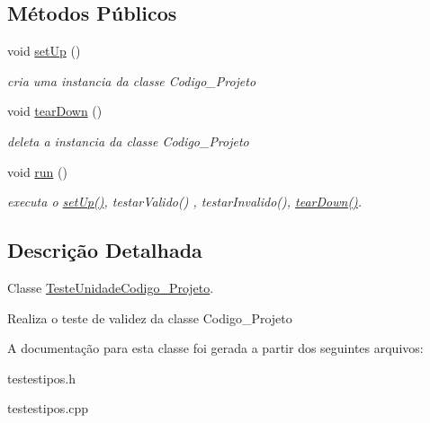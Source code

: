 \subsection*{\-Métodos \-Públicos}
\begin{DoxyCompactItemize}
\item 
\hypertarget{class_teste_unidade_codigo___projeto_a08873edf78ee0550b0377da24fc574fb}{
void \hyperlink{class_teste_unidade_codigo___projeto_a08873edf78ee0550b0377da24fc574fb}{set\-Up} ()}
\label{class_teste_unidade_codigo___projeto_a08873edf78ee0550b0377da24fc574fb}

\begin{DoxyCompactList}\small\item\em cria uma instancia da classe \-Codigo\-\_\-\-Projeto \end{DoxyCompactList}\item 
\hypertarget{class_teste_unidade_codigo___projeto_a1e02a73686fa764e0189a24b1b3a5f46}{
void \hyperlink{class_teste_unidade_codigo___projeto_a1e02a73686fa764e0189a24b1b3a5f46}{tear\-Down} ()}
\label{class_teste_unidade_codigo___projeto_a1e02a73686fa764e0189a24b1b3a5f46}

\begin{DoxyCompactList}\small\item\em deleta a instancia da classe \-Codigo\-\_\-\-Projeto \end{DoxyCompactList}\item 
\hypertarget{class_teste_unidade_codigo___projeto_ab54dceaedb9cc4bbd14360b97d6a47a3}{
void \hyperlink{class_teste_unidade_codigo___projeto_ab54dceaedb9cc4bbd14360b97d6a47a3}{run} ()}
\label{class_teste_unidade_codigo___projeto_ab54dceaedb9cc4bbd14360b97d6a47a3}

\begin{DoxyCompactList}\small\item\em executa o \hyperlink{class_teste_unidade_codigo___projeto_a08873edf78ee0550b0377da24fc574fb}{set\-Up()}, testar\-Valido() , testar\-Invalido(), \hyperlink{class_teste_unidade_codigo___projeto_a1e02a73686fa764e0189a24b1b3a5f46}{tear\-Down()}. \end{DoxyCompactList}\end{DoxyCompactItemize}


\subsection{\-Descrição \-Detalhada}
\-Classe \hyperlink{class_teste_unidade_codigo___projeto}{\-Teste\-Unidade\-Codigo\-\_\-\-Projeto}. 

\-Realiza o teste de validez da classe \-Codigo\-\_\-\-Projeto 

\-A documentação para esta classe foi gerada a partir dos seguintes arquivos\-:\begin{DoxyCompactItemize}
\item 
testestipos.\-h\item 
testestipos.\-cpp\end{DoxyCompactItemize}
